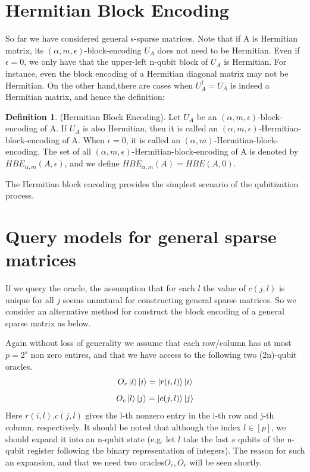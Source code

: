 \documentclass[12pt, oneside]{book}
\theoremstyle{definition}
\newtheorem{definition}{Definition}[section]
\theoremstyle{definition}
\theoremstyle{remark}
\begin{document}
\section{Hermitian Block Encoding}
So far we have considered general s-sparse matrices. Note that if A is Hermitian matrix, its $(\alpha,m,\epsilon)$-block-encoding $U_A$ does not need to be Hermitian. Even if $\epsilon=0$, we only have that the upper-left n-qubit block of $U_A$ is Hermitian. For instance, even the block encoding of a Hermitian diagonal matrix may not be Hermitian. On the other hand,there are cases when $U^{\dagger}_A=U_A$ is indeed a Hermitian matrix, and hence the definition:
\begin{definition}
    (Hermitian Block Encoding). Let $U_A$ be an $(\alpha,m,\epsilon)$-block-encoding of A. If $U_A$ is also Hermitian, then it is called an $(\alpha,m,\epsilon)$-Hermitian-block-encoding of A. When $\epsilon=0$, it is called an $(\alpha,m)$-Hermitian-block-encoding. The set of all $(\alpha,m,\epsilon)$-Hermitian-block-encoding of A is denoted by $HBE_{\alpha,m}(A,\epsilon)$, and we define $HBE_{\alpha,m}(A)=HBE(A,0)$.
\end{definition}
The Hermitian block encoding provides the simplest scenario of the qubitization process.

\section{Query models for general sparse matrices}
If we query the oracle, the assumption that for each $l$ the value of $c(j,l)$ is unique for all $j$ seems unnatural for constructing general sparse matrices. So we consider an alternative method for construct the block encoding of a general sparse matrix as below.

Again without loss of generality we assume that each row/column has at most $p=2^s$ non zero entires, and that we have access to the following two (2n)-qubit oracles.
\[
O_r\ket{l}\ket{i}=\ket{r(i,l)}\ket{i}
\]
\[
O_c\ket{l}\ket{j}=\ket{c(j,l)}\ket{j}
\]
Here $r(i,l)$,$c(j,l)$ gives the l-th nonzero entry in the i-th row and j-th column, respectively. It should be noted that although the index $l\in[p]$, we should expand it into an n-qubit state (e.g. let $l$ take the last $s$ qubits of the n-qubit register following the binary representation of integers). The reason for such an expansion, and that we need two oracles$O_c,O_r$ will be seen shortly.
\end{document}
